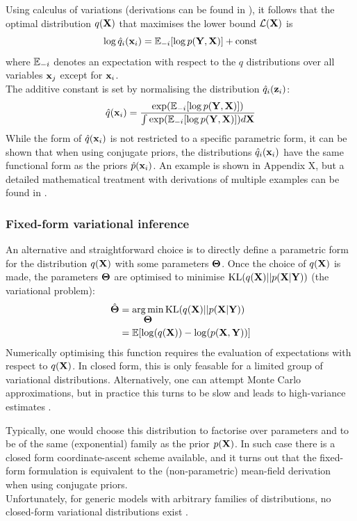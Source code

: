 Using calculus of variations (derivations can be found in \cite{Bishop,Murphy}), it follows that the optimal distribution $q({\bf X})$ that maximises the lower bound $\mathcal{L}({\bf X})$ is
\begin{equation} \label{eq:optimal}
	\log \hat{q}_i({\bf x}_i) = \mathbb{E}_{-i} [\log p({\bf Y},{\bf X})] + \mathrm{const}
\end{equation}
where $\mathbb{E}_{-i}$ denotes an expectation with respect to the $q$ distributions over all variables ${\bf x}_j$ except for ${\bf x}_i$.\\
The additive constant is set by normalising the distribution $\hat{q}_i({\bf z}_i)$:
\[
	\hat{q}({\bf x}_i) = \frac{\exp(\mathbb{E}_{-i}[\log p({\bf Y},{\bf X})])}{\int \exp(\mathbb{E}_{-i}[\log p({\bf Y},{\bf X})]) d{\bf X}}
\]
While the form of $\hat{q}({\bf x}_i)$ is not restricted to a specific parametric form, it can be shown that when using conjugate priors, the distributions $\hat{q}_i({\bf x}_i)$ have the same functional form as the priors $\hat{p}({\bf x}_i)$. An example is shown in Appendix X, but a detailed mathematical treatment with derivations of multiple examples can be found in \cite{Bishop,Murphy,Zhao2009}.


\subsubsection{Fixed-form variational inference}  \label{section:fixed_form}

An alternative and straightforward choice is to directly define a parametric form for the distribution $q({\bf X})$ with some parameters $\mbox{\boldmath $\Theta$}$. Once the choice of $q({\bf X})$ is made, the parameters $\mbox{\boldmath $\Theta$}$ are optimised to minimise ${\rm KL}(q({\bf X})||p({\bf X}|{\bf Y}))$ (the variational problem):
\begin{align}
	\hat{\mbox{\boldmath $\Theta$}} &= \operatorname*{arg\,min}_{\mbox{\boldmath $\Theta$}} {\rm KL}(q({\bf X})||p({\bf X}|{\bf Y})) \\
	&= \mathbb{E}[\log(q({\bf X})) - \log(p({\bf X},{\bf Y}))]
\end{align}
Numerically optimising this function requires the evaluation of expectations with respect to $q({\bf X})$. In closed form, this is only feasable for a limited group of variational distributions. Alternatively, one can attempt Monte Carlo approximations, but in practice this turns to be slow and leads to high-variance estimates \cite{Braun2007,Ranganath2014,Braun2007}.

Typically, one would choose this distribution to factorise over parameters and to be of the same (exponential) family as the prior $p({\bf X})$. In such case there is a closed form coordinate-ascent scheme available, and it turns out that the fixed-form formulation is equivalent to the (non-parametric) mean-field derivation when using conjugate priors.\\
Unfortunately, for generic models with arbitrary families of distributions, no closed-form variational distributions exist \cite{Zhang2017,Blei2016}. 


